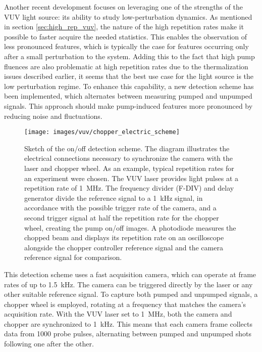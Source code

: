 Another recent development focuses on leveraging one of the strengths of the VUV light source: its ability to study low-perturbation dynamics.
As mentioned in section \ref{sec:high_rep_vuv}, the nature of the high repetition rates make it possible to faster acquire the needed statistics.
This enables the observation of less pronounced features, which is typically the case for features occurring only after a small perturbation to the system.
Adding this to the fact that high pump fluences are also problematic at high repetition rates due to the thermalization issues described earlier, it seems that the best use case for the light source is the low perturbation regime.
To enhance this capability, a new detection scheme has been implemented, which alternates between measuring pumped and unpumped signals.
This approach should make pump-induced features more pronounced by reducing noise and fluctuations.

\begin{figure}
	\centering
	\texttt{[image: images/vuv/chopper\_electric\_scheme]}
	\caption{Sketch of the on/off detection scheme. The diagram illustrates the electrical connections necessary to synchronize the camera with the laser and chopper wheel. As an example, typical repetition rates for an experiment were chosen. The VUV laser provides light pulses at a repetition rate of \qty{1}{\mega\hertz}. The frequency divider (F-DIV) and delay generator divide the reference signal to a \qty{1}{\kilo\hertz} signal, in accordance with the possible trigger rate of the camera, and a second trigger signal at half the repetition rate for the chopper wheel, creating the pump on/off images. A photodiode measures the chopped beam and displays its repetition rate on an oscilloscope alongside the chopper controller reference signal and the camera reference signal for comparison.}
	\label{fig:triggerscheme}
\end{figure}

This detection scheme uses a fast acquisition camera, which can operate at frame rates of up to \qty{1.5}{\kilo\hertz}.
The camera can be triggered directly by the laser or any other suitable reference signal.
To capture both pumped and unpumped signals, a chopper wheel is employed, rotating at a frequency that matches the camera's acquisition rate.
With the VUV laser set to \qty{1}{\mega\hertz}, both the camera and chopper are synchronized to \qty{1}{\kilo\hertz}.
This means that each camera frame collects data from 1000 probe pulses, alternating between pumped and unpumped shots following one after the other.

